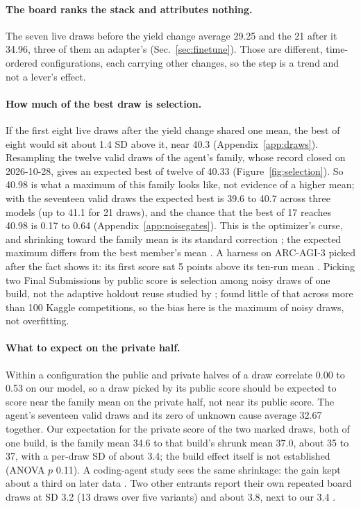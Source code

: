 \paragraph{The board ranks the stack and attributes nothing.}
The seven live draws before the yield change average 29.25 and the 21 after it 34.96, three of them an adapter's (Sec.~\ref{sec:finetune}). %
Those are different, time-ordered configurations, each carrying other changes, so the step is a trend and not a lever's effect.

\paragraph{How much of the best draw is selection.}
If the first eight live draws after the yield change shared one mean, the best of eight would sit about 1.4 SD above it, near 40.3 (Appendix~\ref{app:draws}). %
Resampling the twelve valid draws of the agent's family, whose record closed on 2026-10-28, gives an expected best of twelve of 40.33 (Figure~\ref{fig:selection}). %
So 40.98 is what a maximum of this family looks like, not evidence of a higher mean; with the seventeen valid draws the expected best is 39.6 to 40.7 across three models (up to 41.1 for 21 draws), and the chance that the best of 17 reaches 40.98 is 0.17 to 0.64 (Appendix~\ref{app:noisegates}). %
This is the optimizer's curse, and shrinking toward the family mean is its standard correction \citep{smith2006optimizer}; the expected maximum differs from the best member's mean \citep{mollersen2023multiplicity}. A harness on ARC-AGI-3 picked after the fact shows it: its first score sat 5 points above its ten-run mean \citep{lehmann2026harness}.
Picking two Final Submissions by public score is selection among noisy draws of one build, not the adaptive holdout reuse studied by \citet{blum2015ladder}; \citet{roelofs2019meta} found little of that across more than 100 Kaggle competitions, so the bias here is the maximum of noisy draws, not overfitting. %

\paragraph{What to expect on the private half.}
Within a configuration the public and private halves of a draw correlate 0.00 to 0.53 on our model, so a draw picked by its public score should be expected to score near the family mean on the private half, not near its public score. %
The agent's seventeen valid draws and its zero of unknown cause average 32.67 together. Our expectation for the private score of the two marked draws, both of one build, is the family mean 34.6 to that build's shrunk mean 37.0, about 35 to 37, with a per-draw SD of about 3.4; the build effect itself is not established (ANOVA $p$ 0.11). A coding-agent study sees the same shrinkage: the gain kept about a third on later data \citep{arino2026identical}. Two other entrants report their own repeated board draws at SD 3.2 (13 draws over five variants) and about 3.8, next to our 3.4 \citep{rodrigues2026arc3,vilot8882026arc3}. %

